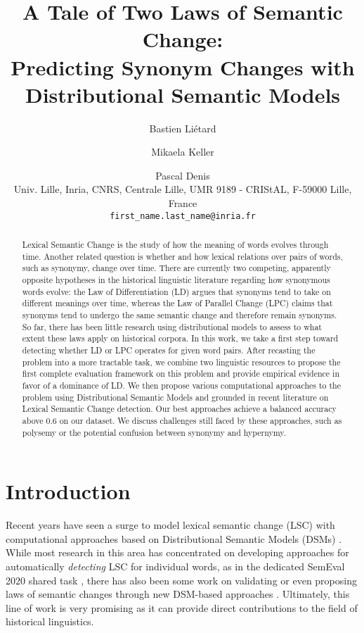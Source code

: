 \documentclass[11pt]{article}
\title{A Tale of Two Laws of Semantic Change: \\Predicting Synonym Changes with Distributional Semantic Models}
\author{  Bastien Li\'etard \and Mikaela Keller \and
        Pascal Denis \\
        Univ. Lille, Inria, CNRS, Centrale Lille, UMR 9189 - CRIStAL, F-59000 Lille, France \\ \texttt{first\_name.last\_name@inria.fr}}
\begin{document}
\maketitle
\begin{abstract}
Lexical Semantic Change is the study of how the meaning of words evolves through time. 
Another related question is whether and how lexical relations over pairs of words, such as synonymy, change over time. 
There are currently two competing, apparently opposite hypotheses in the historical linguistic literature regarding how synonymous words evolve: 
the Law of Differentiation (LD) argues that synonyms tend to take on different meanings over time, whereas the Law of Parallel Change (LPC) claims that synonyms tend to undergo the same semantic change and therefore remain synonyms. 
So far, there has been little research using distributional models to assess to what extent these laws apply on historical corpora.
In this work, we take a first step toward detecting whether LD or LPC operates for given word pairs. After recasting the problem into a more tractable task, we combine two linguistic resources to propose the first complete evaluation framework on this problem and provide empirical evidence in favor of a dominance of LD. We then propose various computational approaches to the problem using Distributional Semantic Models and grounded in recent literature on Lexical Semantic Change detection. Our best approaches achieve a balanced accuracy above $0.6$ on our dataset. We discuss challenges still faced by these approaches, such as polysemy or the potential confusion between synonymy and hypernymy.

\end{abstract}

\section{Introduction}

Recent years have seen a surge to model lexical semantic change (LSC) with computational approaches based on Distributional Semantic Models (DSMs) \citep{tahmasebi-etal-2021-survey}.
While most research in this area has concentrated on developing approaches for automatically \textit{detecting} LSC for individual words, as in the dedicated SemEval 2020 shared task \citep{schlechtweg-etal-2020-semeval}, there has also been some work on validating or even proposing laws of semantic changes through new DSM-based approaches \citep{dubossarsky-etal-2015-bottom-up, hamilton-etal-2016-diachronic,dubossarsky-etal-2017-outta}. Ultimately, this line of work is very promising as it can provide direct contributions to the field of historical linguistics. 
\end{document}
